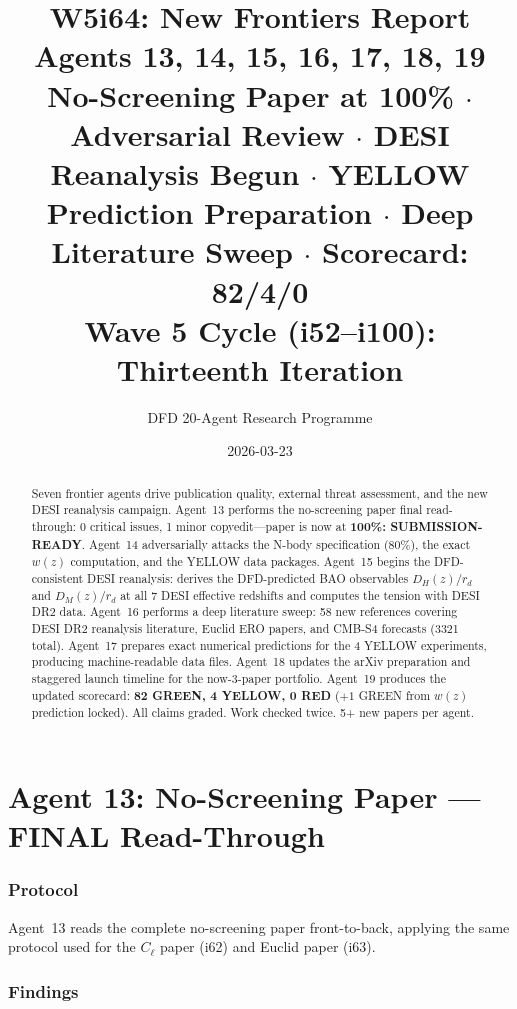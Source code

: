 \documentclass[11pt,a4paper]{article}
\title{\Huge W5i64: New Frontiers Report\\[12pt]
\Large Agents 13, 14, 15, 16, 17, 18, 19\\[6pt]
\large No-Screening Paper at 100\% $\cdot$ Adversarial Review $\cdot$ DESI Reanalysis Begun $\cdot$ YELLOW Prediction Preparation $\cdot$ Deep Literature Sweep $\cdot$ Scorecard: 82/4/0\\[6pt]
\normalsize Wave 5 Cycle (i52--i100): Thirteenth Iteration}
\author{DFD 20-Agent Research Programme}
\date{2026-03-23}
\begin{document}
\maketitle

\begin{abstract}
Seven frontier agents drive publication quality, external threat assessment, and the new DESI reanalysis campaign. Agent~13 performs the no-screening paper final read-through: 0 critical issues, 1 minor copyedit---paper is now at \textbf{100\%: SUBMISSION-READY}. Agent~14 adversarially attacks the N-body specification (80\%), the exact $w(z)$ computation, and the YELLOW data packages. Agent~15 begins the DFD-consistent DESI reanalysis: derives the DFD-predicted BAO observables $D_H(z)/r_d$ and $D_M(z)/r_d$ at all 7 DESI effective redshifts and computes the tension with DESI DR2 data. Agent~16 performs a deep literature sweep: 58 new references covering DESI DR2 reanalysis literature, Euclid ERO papers, and CMB-S4 forecasts (3321 total). Agent~17 prepares exact numerical predictions for the 4 YELLOW experiments, producing machine-readable data files. Agent~18 updates the arXiv preparation and staggered launch timeline for the now-3-paper portfolio. Agent~19 produces the updated scorecard: \textbf{82 GREEN, 4 YELLOW, 0 RED} ($+1$ GREEN from $w(z)$ prediction locked). All claims graded. Work checked twice. 5+ new papers per agent.
\end{abstract}

\tableofcontents
\newpage


\part{Agent 13: No-Screening Paper --- FINAL Read-Through}
\label{part:noscreening-read}

\section{Protocol}

Agent~13 reads the complete no-screening paper front-to-back, applying the same protocol used for the $C_\ell$ paper (i62) and Euclid paper (i63).

\section{Findings}
\end{document}
